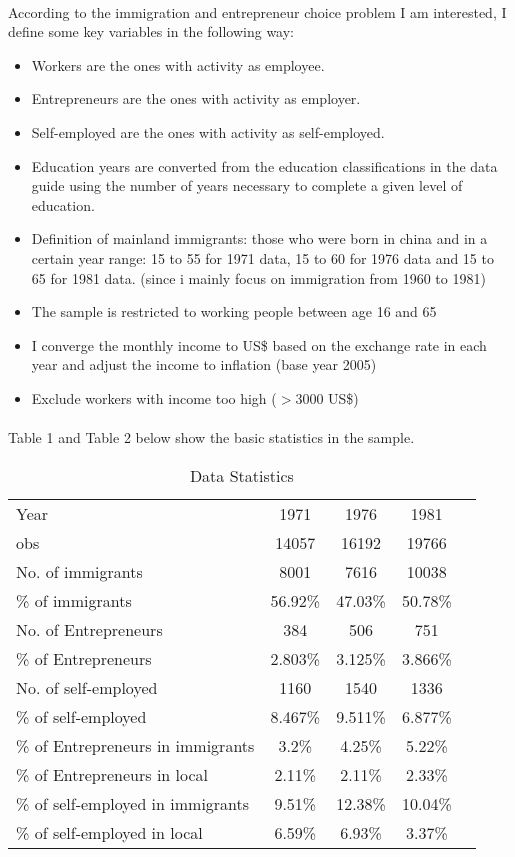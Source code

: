 \documentclass[12pt]{article}
\begin{document}
\paragraph{}
According to the immigration and entrepreneur choice problem I am interested, I define some key variables in the following way: 
\begin{itemize}
\item Workers are the ones with activity as employee.
\item Entrepreneurs are the ones with activity as employer.
\item Self-employed are the ones with activity as self-employed.
\item Education years are converted from the education classifications in the data guide using the number of years necessary to complete a given level of education.
\item Definition of mainland immigrants: those who were born in china and in a certain year range: 15 to 55 for 1971 data, 15 to 60 for 1976 data and 15 to 65 for 1981 data. (since i mainly focus on immigration from 1960 to 1981)
\item The sample is restricted to working people between age 16 and 65
\item I converge the monthly income to US\$ based on the exchange rate in each year and adjust the income to inflation (base year 2005)
\item Exclude workers with income too high ($>3000$ US\$)
\end{itemize}
\paragraph{}
Table 1 and Table 2 below show the basic statistics in the sample.

\begin{table}[H]
\caption{Data Statistics \label{ppd}}
\begin{center}
\begin{tabular}{lcccc}
\hline
\hline
Year& 1971 & 1976&1981  \\
obs&14057&16192&19766\\
\hline
No. of immigrants &8001  &7616 &   10038\\
\% of immigrants &   56.92\% &47.03\%&50.78\%\\
No. of Entrepreneurs   &384 &506 &751 \\
\% of Entrepreneurs    &2.803\% &3.125\% & 3.866\%\\
No. of self-employed   &1160 &1540 &1336 \\
\% of self-employed    &8.467\% &9.511\% & 6.877\%\\
\% of Entrepreneurs in immigrants & 3.2\% &4.25\% &5.22\%\\
\% of Entrepreneurs in local & 2.11\% &2.11\% &2.33\%\\
\% of self-employed in immigrants & 9.51\% &12.38\% &10.04\%\\
\% of self-employed in local & 6.59\% &6.93\% &3.37\%\\

\hline
\end{tabular}
\end{center}
\end{table}
\end{document}
